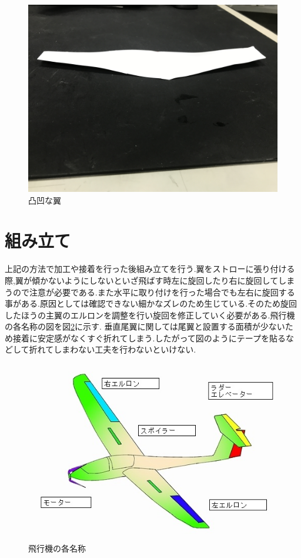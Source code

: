 \begin{figure}[htbp]
  \begin{center}
    \includegraphics[width=140mm]{NG.JPG}
    \end{center}
  \caption{凸凹な翼}
 \label{fig:NG}
\end{figure}

\section{組み立て}
上記の方法で加工や接着を行った後組み立てを行う.翼をストローに張り付ける際,翼が傾かないようにしないといざ飛ばす時左に旋回したり右に旋回してしまうので注意が必要である.また水平に取り付けを行った場合でも左右に旋回する事がある.原因としては確認できない細かなズレのため生じている.そのため旋回したほうの主翼のエルロンを調整を行い旋回を修正していく必要がある.飛行機の各名称の図を図\ref{fig:er}に示す.
垂直尾翼に関しては尾翼と設置する面積が少ないため接着に安定感がなくすぐ折れてしまう.したがって図のようにテープを貼るなどして折れてしまわない工夫を行わないといけない.

\begin{figure}[htbp]
  \begin{center}
    \includegraphics[width=140mm]{er.JPG}
    \end{center}
  \caption{飛行機の各名称}
 \label{fig:er}
\end{figure}